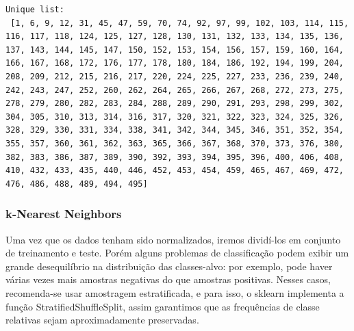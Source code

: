 \documentclass[11pt]{article}
\begin{document}
    \begin{Verbatim}[commandchars=\\\{\}]
Unique list:
 [1, 6, 9, 12, 31, 45, 47, 59, 70, 74, 92, 97, 99, 102, 103, 114, 115, 116, 117, 118, 124, 125, 127, 128, 130, 131, 132, 133, 134, 135, 136, 137, 143, 144, 145, 147, 150, 152, 153, 154, 156, 157, 159, 160, 164, 166, 167, 168, 172, 176, 177, 178, 180, 184, 186, 192, 194, 199, 204, 208, 209, 212, 215, 216, 217, 220, 224, 225, 227, 233, 236, 239, 240, 242, 243, 247, 252, 260, 262, 264, 265, 266, 267, 268, 272, 273, 275, 278, 279, 280, 282, 283, 284, 288, 289, 290, 291, 293, 298, 299, 302, 304, 305, 310, 313, 314, 316, 317, 320, 321, 322, 323, 324, 325, 326, 328, 329, 330, 331, 334, 338, 341, 342, 344, 345, 346, 351, 352, 354, 355, 357, 360, 361, 362, 363, 365, 366, 367, 368, 370, 373, 376, 380, 382, 383, 386, 387, 389, 390, 392, 393, 394, 395, 396, 400, 406, 408, 410, 432, 433, 435, 440, 446, 452, 453, 454, 459, 465, 467, 469, 472, 476, 486, 488, 489, 494, 495]

    \end{Verbatim}

    \subsubsection{k-Nearest Neighbors}\label{k-nearest-neighbors}

Uma vez que os dados tenham sido normalizados, iremos dividí-los em
conjunto de treinamento e teste. Porém alguns problemas de classificação
podem exibir um grande desequilíbrio na distribuição das classes-alvo:
por exemplo, pode haver várias vezes mais amostras negativas do que
amostras positivas. Nesses casos, recomenda-se usar amostragem
estratificada, e para isso, o sklearn implementa a função
StratifiedShuffleSplit, assim garantimos que as frequências de classe
relativas sejam aproximadamente preservadas.
\end{document}
